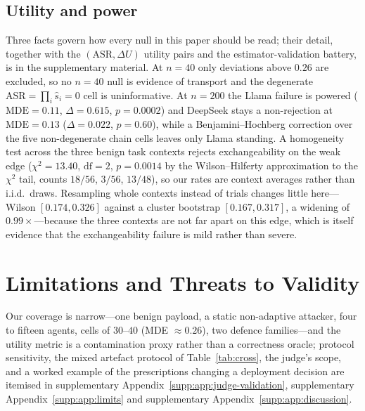 \documentclass[sigconf,anonymous]{aamas}
\newcommand{\suppref}[1]{supplementary Appendix~\ref{supp:#1}}
\begin{document}
\subsection{Utility and power}
\label{sec:utility}

Three facts govern how every null in this paper should be read; their detail, together
with the $(\mathrm{ASR}, \Delta U)$ utility pairs and the estimator-validation
battery, is in the supplementary material. At $n = 40$ only deviations above $0.26$
are excluded, so no $n = 40$ null is evidence of transport and the degenerate
$\mathrm{ASR} = \prod_i \hat s_i = 0$ cell is uninformative. At $n = 200$ the Llama
failure is powered ($\mathrm{MDE} = 0.11$, $\Delta = 0.615$, $p = 0.0002$) and
DeepSeek stays a non-rejection at $\mathrm{MDE} = 0.13$ ($\Delta = 0.022$, $p = 0.60$),
while a Benjamini--Hochberg correction over the five non-degenerate chain cells leaves
only Llama standing. A homogeneity test across the three benign task contexts rejects
exchangeability on the weak edge ($\chi^2 = 13.40$, $\mathrm{df} = 2$, $p = 0.0014$ by
the Wilson--Hilferty approximation to the $\chi^2$ tail, counts $18/56$, $3/56$,
$13/48$), so our rates are context averages rather than
i.i.d.\ draws. Resampling whole contexts instead of trials changes little here---Wilson
$[0.174, 0.326]$ against a cluster bootstrap $[0.167, 0.317]$, a widening of
$0.99\times$---because the three contexts are not far apart on this edge, which is
itself evidence that the exchangeability failure is mild rather than severe.


\section{Limitations and Threats to Validity}
\label{sec:limits}

Our coverage is narrow---one benign payload, a static non-adaptive attacker, four to
fifteen agents, cells of $30$--$40$ (MDE $\approx 0.26$), two defence families---and the
utility metric is a contamination proxy rather than a correctness oracle; protocol
sensitivity, the mixed artefact protocol of Table~\ref{tab:cross}, the judge's scope, and
a worked example of the prescriptions changing a deployment decision are itemised in
\suppref{app:judge-validation}, \suppref{app:limits} and \suppref{app:discussion}.

\end{document}
